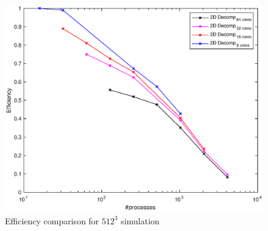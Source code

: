 \begin{figure}
\begin{center}
\includegraphics[scale=0.6]{grafici/5126}
\caption{Efficiency comparison for $512^3$ simulation}
\label{512:eff}
\end{center}
\end{figure}